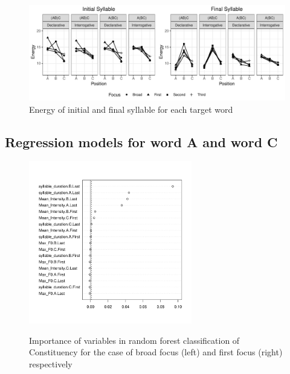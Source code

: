 \documentclass[preprint,review,12pt,authoryear,times]{elsarticle}
\begin{document}
\begin{figure}[htb!]
	\begin{center}
		\includegraphics[width=5in]{Figures/Energy.pdf}
		\caption{Energy of initial and final syllable for each target word}
		\label{figureEnergy}
	\end{center}
\end{figure}


\newpage
\subsection{Regression models for word A and word C}














\newpage


\begin{figure}[ht!]
	\begin{center}
	{\footnotesize
		\includegraphics[width=2.8in]{Figures/phrasingFirstCVarimp.pdf}	
		}
		\caption{Importance of variables in random forest classification of Constituency for the case of broad focus (left) and first focus (right) respectively}
		\label{focusForestFirstC}
	\end{center}
\end{figure}
\end{document}
